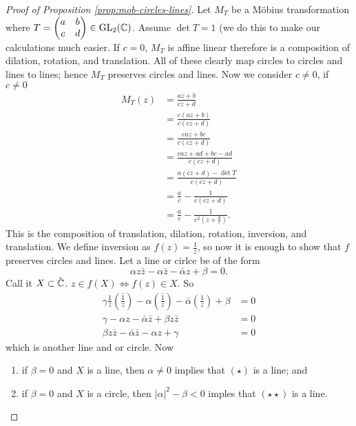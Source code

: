 \begin{proof}[Proof of Proposition \ref{prop:mob-circles-lines}]
    Let $M_T$ be a M\"obius transformation where $T = \begin{pmatrix} a & b \\ c & d \end{pmatrix} \in \operatorname{GL}_2(\mathbb{C})$. 
    Assume $\det{T} = 1$ (we do this to make our calculations much easier.
    If $c = 0$, $M_T$ is affine linear therefore is a composition of dilation, rotation, and translation. 
    All of these clearly map circles to circles and lines to lines; hence $M_T$ preserves circles and lines. 
    Now we consider $c \neq 0$, if $c \neq 0$
    \begin{align*}
        M_T(z) &= \frac{az + b}{cz + d} \\
        &= \frac{c(az + b)}{c(cz + d)} \\
        &= \frac{caz + bc}{c(cz + d)} \\
        &= \frac{caz + ad + bc - ad}{c(cz+d)} \\
        &= \frac{a(cz+d) - \det{T}}{c(cz+d)} \\
        &= \frac ac - \frac{1}{c(cz + d)} \\
        &= \frac ac - \frac{1}{c^2(z + \frac dc)}.
    \end{align*}
    This is the composition of translation, dilation, rotation, inversion, and translation. 
    We define inversion as $f(z) = \frac 1z$, so now it is enough to show that $f$ preserves circles and lines. 
    Let a line or cirlce be of the form
    \[ \alpha z \bar z - \alpha \bar z - \bar \alpha z + \beta = 0. \]
    Call it $X \subset \hat {\mathbb{C}}$. $z \in f(X) \iff f(z) \in X$. So
    \begin{align*}
        \gamma \frac 1z \left( \overline{\frac 1z} \right) - \alpha \left( \overline{\frac1z} \right) - \bar \alpha \left(\frac1z\right) + \beta &= 0 \\
        \gamma - \alpha z - \bar \alpha \bar z + \beta z \bar z &= 0 \\
        \beta z \bar z - \bar \alpha \bar z - \alpha z + \gamma &= 0 \tag{$\star$}
    \end{align*}
    which is another line and or circle. Now
    \begin{enumerate}
        \item if $\beta = 0$ and $X$ is a line, then $\alpha \neq 0$ implies that $(\star)$ is a line; and
        \item if $\beta = 0$ and $X$ is a circle, then $\lvert \alpha \rvert^2 - \beta < 0$ imples that $(\star\star)$ is a line.

\end{enumerate}
\end{proof}
